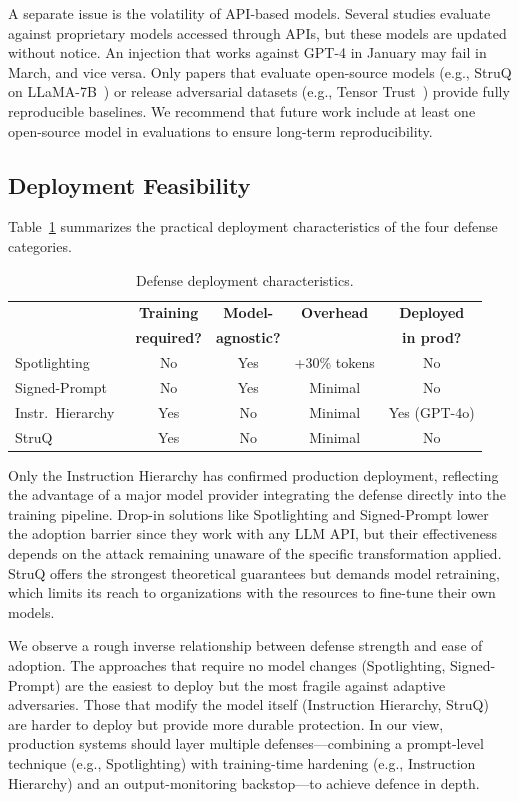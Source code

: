 A separate issue is the volatility of API-based models. Several studies evaluate against proprietary models accessed through APIs, but these models are updated without notice. An injection that works against GPT-4 in January may fail in March, and vice versa. Only papers that evaluate open-source models (e.g., StruQ on LLaMA-7B~\cite{chen2024struq}) or release adversarial datasets (e.g., Tensor Trust~\cite{toyer2024tensor}) provide fully reproducible baselines. We recommend that future work include at least one open-source model in evaluations to ensure long-term reproducibility.

\subsection{Deployment Feasibility}

Table~\ref{tab:deployment} summarizes the practical deployment characteristics of the four defense categories.

\begin{table}[t]
\centering
\caption{Defense deployment characteristics.}
\label{tab:deployment}
\footnotesize
\begin{tabular}{@{}lcccc@{}}
\toprule
 & \textbf{Training} & \textbf{Model-} & \textbf{Overhead} & \textbf{Deployed} \\
 & \textbf{required?} & \textbf{agnostic?} & & \textbf{in prod?} \\
\midrule
Spotlighting~\cite{hines2024spotlighting} & No & Yes & +30\% tokens & No \\
Signed-Prompt~\cite{suo2024signedprompt} & No & Yes & Minimal & No \\
Instr.\ Hierarchy~\cite{wallace2024hierarchy} & Yes & No & Minimal & Yes (GPT-4o) \\
StruQ~\cite{chen2024struq} & Yes & No & Minimal & No \\
\bottomrule
\end{tabular}
\end{table}

Only the Instruction Hierarchy has confirmed production deployment, reflecting the advantage of a major model provider integrating the defense directly into the training pipeline. Drop-in solutions like Spotlighting and Signed-Prompt lower the adoption barrier since they work with any LLM API, but their effectiveness depends on the attack remaining unaware of the specific transformation applied. StruQ offers the strongest theoretical guarantees but demands model retraining, which limits its reach to organizations with the resources to fine-tune their own models.

We observe a rough inverse relationship between defense strength and ease of adoption. The approaches that require no model changes (Spotlighting, Signed-Prompt) are the easiest to deploy but the most fragile against adaptive adversaries. Those that modify the model itself (Instruction Hierarchy, StruQ) are harder to deploy but provide more durable protection. In our view, production systems should layer multiple defenses---combining a prompt-level technique (e.g., Spotlighting) with training-time hardening (e.g., Instruction Hierarchy) and an output-monitoring backstop---to achieve defence in depth.
